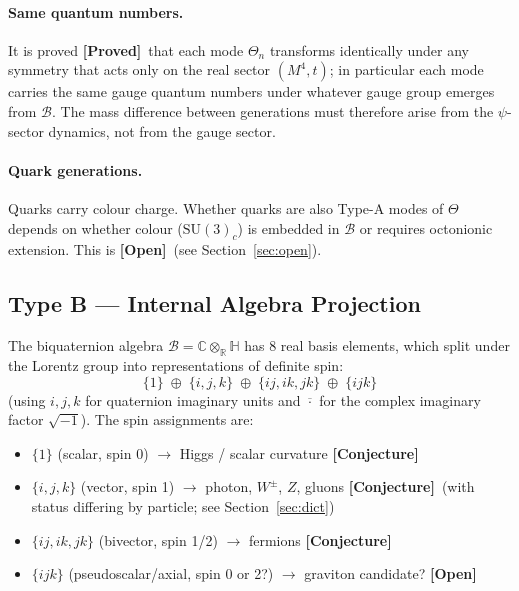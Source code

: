 \documentclass[12pt,a4paper]{article}
\theoremstyle{remark}
\newcommand{\B}{\mathcal{B}}
\newcommand{\C}{\mathbb{C}}
\newcommand{\R}{\mathbb{R}}
\newcommand{\H}{\mathbb{H}}
\newcommand{\proved}{\textbf{[Proved]}}
\newcommand{\conjecture}{\textbf{[Conjecture]}}
\newcommand{\openq}{\textbf{[Open]}}
\begin{document}
\paragraph{Same quantum numbers.}
It is proved \proved\ that each mode $\Theta_n$ transforms identically under
any symmetry that acts only on the real sector $(M^4,t)$; in particular each
mode carries the same gauge quantum numbers under whatever gauge group emerges
from $\B$.  The mass difference between generations must therefore arise from
the $\psi$-sector dynamics, not from the gauge sector.

\paragraph{Quark generations.}
Quarks carry colour charge.  Whether quarks are also Type-A modes of $\Theta$
depends on whether colour ($\mathrm{SU}(3)_c$) is embedded in $\B$ or requires
octonionic extension.  This is \openq\ (see Section~\ref{sec:open}).

\subsection{Type B — Internal Algebra Projection}
\label{sec:typeB}

The biquaternion algebra $\B = \C\otimes_\R\H$ has 8 real basis elements,
which split under the Lorentz group into representations of definite spin:
\begin{equation}
  \{1\} \;\oplus\; \{i,j,k\} \;\oplus\; \{ij,ik,jk\} \;\oplus\; \{ijk\}
  \label{eq:alg_split}
\end{equation}
(using $i,j,k$ for quaternion imaginary units and $\overline{\cdot}$ for the
complex imaginary factor $\sqrt{-1}$).  The spin assignments are:

\begin{itemize}
  \item $\{1\}$ (scalar, spin 0) $\longrightarrow$ Higgs / scalar curvature
        \conjecture
  \item $\{i,j,k\}$ (vector, spin 1) $\longrightarrow$ photon, $W^\pm$, $Z$,
        gluons \conjecture\ (with status differing by particle; see
        Section~\ref{sec:dict})
  \item $\{ij,ik,jk\}$ (bivector, spin 1/2) $\longrightarrow$ fermions
        \conjecture
  \item $\{ijk\}$ (pseudoscalar/axial, spin 0 or 2?) $\longrightarrow$
        graviton candidate? \openq
\end{itemize}
\end{document}

